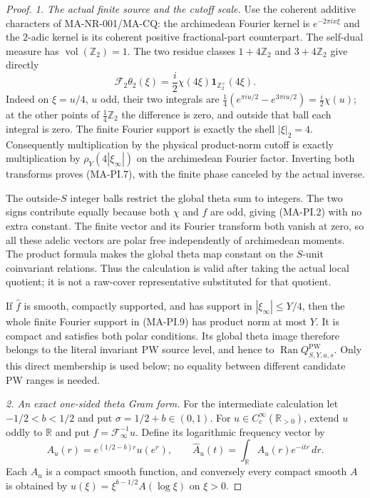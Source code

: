 \begin{proof}
\emph{1. The actual finite source and the cutoff scale.}
Use the coherent additive characters of MA-NR-001/MA-CQ:
the archimedean Fourier kernel is $e^{-2\pi i x\xi}$ and
the $2$-adic kernel is its coherent positive fractional-part
counterpart.  The self-dual measure has
$\operatorname{vol}(\mathbb Z_2)=1$.
The two residue classes $1+4\mathbb Z_2$ and
$3+4\mathbb Z_2$ give directly
\[
 \mathcal F_2\theta_2(\xi)
     =\frac{i}{2}\chi(4\xi)
                           \mathbf1_{\mathbb Z_2^\times}(4\xi).
 \tag{MA-PI.9}
\]
Indeed on $\xi=u/4$, $u$ odd, their two integrals are
$\tfrac14(e^{\pi iu/2}-e^{3\pi iu/2})=\tfrac i2\chi(u)$;
at the other points of $\tfrac14\mathbb Z_2$ the difference
is zero, and outside that ball each integral is zero.
The finite Fourier support is exactly the shell
$|\xi|_2=4$.  Consequently multiplication by the physical
product-norm cutoff is exactly multiplication by
$\rho_Y(4|\xi_\infty|)$ on the archimedean Fourier factor.
Inverting both transforms proves (MA-PI.7), with the
finite phase canceled by the actual inverse.

The outside-$S$ integer balls restrict the global theta
sum to integers.  The two signs contribute equally because
both $\chi$ and $f$ are odd, giving (MA-PI.2) with no
extra constant.  The finite vector and its Fourier
transform both vanish at zero, so all these adelic
vectors are polar free independently of archimedean
moments.  The product formula makes the global theta
map constant on the $S$-unit coinvariant relations.
Thus the calculation is valid after taking the actual
local quotient; it is not a raw-cover representative
substituted for that quotient.

If $\widehat f$ is smooth, compactly supported, and has
support in $|\xi_\infty|\leq Y/4$, then the whole finite
Fourier support in (MA-PI.9) has product norm at most
$Y$.  It is compact and satisfies both polar conditions.
Its global theta image therefore belongs to the literal
invariant PW source level, and hence to
$\operatorname{Ran}Q^{\mathrm{PW}}_{S,Y,a,s}$.
Only this direct membership is used below; no equality
between different candidate PW ranges is needed.

\emph{2. An exact one-sided theta Gram form.}
For the intermediate calculation let $-1/2<b<1/2$ and
put $\sigma=1/2+b\in(0,1)$.
For $u\in C_c^\infty(\mathbb R_{>0})$, extend $u$ oddly
to $\mathbb R$ and put $f=\mathcal F_\infty^{-1}u$.
Define its logarithmic frequency vector by
\[
 A_u(r)=e^{(1/2-b)r}u(e^r),\qquad
 \widehat A_u(t)=\int_{\mathbb R}A_u(r)e^{-itr}\,dr.
 \tag{MA-PI.10}
\]
Each $A_u$ is a compact smooth function, and conversely
every compact smooth $A$ is obtained by
$u(\xi)=\xi^{b-1/2}A(\log\xi)$ on $\xi>0$.


\end{proof}
